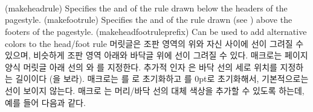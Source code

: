 \begin{syntax}
\cmd{\makeheadrule} \\
\cmd{\makefootrule} \\
\cmd{\makeheadfootruleprefix}\\
\end{syntax}
\glossary(makeheadrule)%
  {}%
  {Specifies the  and  of the rule drawn below the
   headers of the  pagestyle.}%
\glossary(makefootrule)%
  {}%
  {Specifies the  and  of the rule drawn 
   (see ) above the footers of the
   pagestyle.}%
\glossary(makeheadfootruleprefix)
{}%
{Can be used to add alternative colors to the head/foot rule}%
머릿글은 조판 영역의 위와 자신
사이에 선이 그려질 수 있으며, 비슷하게 조판 영역
아래와 바닥글 위에 선이 그려질 수 있다.
\cmd{\makeheadrule} 매크로는  페이지 양식
머릿글 아래 선의  와 를
지정한다.
추가적 인자 은 바닥 선의 세로 위치를 지정하는 길이이다
(\cmd{\footruleskip}을 보라).
\cmd{\makepagestyle} 매크로는 를 \lnc{\textwidth}로 초기화하고
를 0pt로 초기화해서, 기본적으로는 선이 보이지 않는다.
매크로 \cmd{\makeheadfootruleprefix}는 머리/바닥 선의 대체 색상을 추가할 수
있도록 하는데, 예를 들어 다음과 같다.
\begin{lcode}
\end{lcode}


